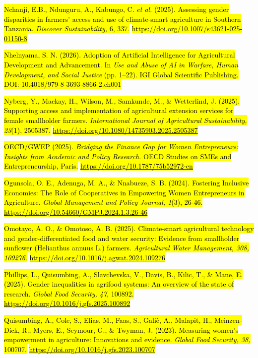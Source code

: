 \hl{Nchanji, E.B., Ndunguru, A., Kabungo, C. \emph{et al.} (2025).
Assessing gender disparities in farmers' access and use of climate-smart
agriculture in Southern Tanzania. \emph{Discover Sustainability,} 6,
337.}
\href{https://doi.org/10.1007/s43621-025-01150-8}{\hl{https://doi.org/10.1007/s43621-025-01150-8}}

\hl{Nhelnyama, S. N. (2026). Adoption of Artificial Intelligence for
Agricultural Development and Advancement. In \emph{Use and Abuse of AI
in Warfare, Human Development, and Social Justice} (pp. 1--22). IGI
Global Scientific Publishing. DOI: 10.4018/979-8-3693-8866-2.ch001}

\hl{Nyberg, Y., Mackay, H., Wilson, M., Samkunde, M., \& Wetterlind, J.
(2025). Supporting access and implementation of agricultural extension
services for female smallholder farmers. \emph{International Journal of
Agricultural Sustainability, 23}(1), 2505387.}
\href{https://doi.org/10.1080/14735903.2025.2505387}{\hl{https://doi.org/10.1080/14735903.2025.2505387}}

\hl{OECD/GWEP (2025). \emph{Bridging the Finance Gap for Women
Entrepreneurs: Insights from Academic and Policy Research.} OECD Studies
on SMEs and Entrepreneurship, Paris.}
\href{https://doi.org/10.1787/75b52972-en}{\hl{https://doi.org/10.1787/75b52972-en}}

\hl{Ogunsola, O. E., Adenuga, M. A., \& Nnabueze, S. B. (2024).
Fostering Inclusive Economies: The Role of Cooperatives in Empowering
Women Entrepreneurs in Agriculture. \emph{Global Management and Policy
Journal, 1}(3), 26-46.}
\href{https://doi.org/10.54660/GMPJ.2024.1.3.26-46}{\hl{https://doi.org/10.54660/GMPJ.2024.1.3.26-46}}

\hl{Omotayo, A. O., \& Omotoso, A. B. (2025). Climate-smart agricultural
technology and gender-differentiated food and water security: Evidence
from smallholder sunflower (Helianthus annuus L.) farmers.
\emph{Agricultural Water Management, 308, 109276}.}
\href{https://doi.org/10.1016/j.agwat.2024.109276}{\hl{https://doi.org/10.1016/j.agwat.2024.109276}}

\hl{Phillips, L., Quisumbing, A., Slavchevska, V., Davis, B., Kilic, T.,
\& Mane, E. (2025). Gender inequalities in agrifood systems: An overview
of the state of research. \emph{Global Food Security, 47}, 100892.}
\href{https://doi.org/10.1016/j.gfs.2025.100892}{\hl{https://doi.org/10.1016/j.gfs.2025.100892}}

\hl{Quisumbing, A., Cole, S., Elias, M., Faas, S., Galiè, A., Malapit,
H., Meinzen-Dick, R., Myers, E., Seymour, G., \& Twyman, J. (2023).
Measuring women's empowerment in agriculture: Innovations and evidence.
\emph{Global Food Security, 38,} 100707.}
\href{https://doi.org/10.1016/j.gfs.2023.100707}{\hl{https://doi.org/10.1016/j.gfs.2023.100707}}

